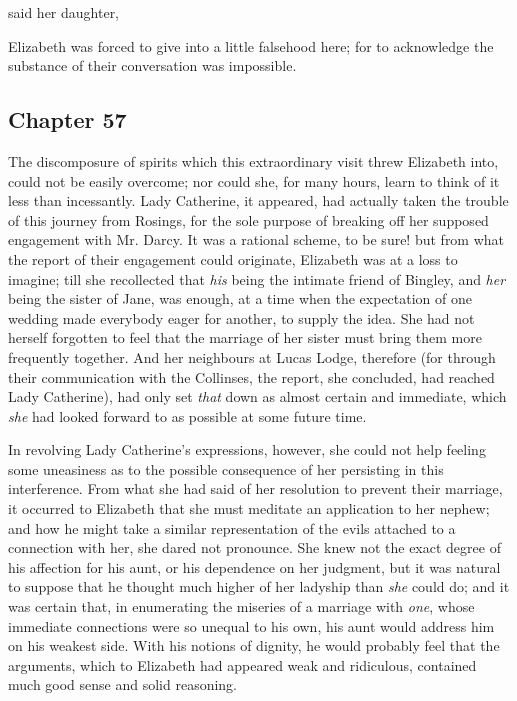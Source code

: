  said her daughter, 


Elizabeth was forced to give into a little falsehood here; for to acknowledge the substance of their conversation was impossible.

\subsection[chapter-57]{\useURL[url57][][][]\from[url57] Chapter 57}

The discomposure of spirits which this extraordinary visit threw Elizabeth into, could not be easily overcome; nor could she, for many hours, learn to think of it less than incessantly. Lady Catherine, it appeared, had actually taken the trouble of this journey from Rosings, for the sole purpose of breaking off her supposed engagement with Mr. Darcy. It was a rational scheme, to be sure! but from what the report of their engagement could originate, Elizabeth was at a loss to imagine; till she recollected that {\em his} being the intimate friend of Bingley, and {\em her} being the sister of Jane, was enough, at a time when the expectation of one wedding made everybody eager for another, to supply the idea. She had not herself forgotten to feel that the marriage of her sister must bring them more frequently together. And her neighbours at Lucas Lodge, therefore (for through their communication with the Collinses, the report, she concluded, had reached Lady Catherine), had only set {\em that} down as almost certain and immediate, which {\em she} had looked forward to as possible at some future time.

In revolving Lady Catherine's expressions, however, she could not help feeling some uneasiness as to the possible consequence of her persisting in this interference. From what she had said of her resolution to prevent their marriage, it occurred to Elizabeth that she must meditate an application to her nephew; and how he might take a similar representation of the evils attached to a connection with her, she dared not pronounce. She knew not the exact degree of his affection for his aunt, or his dependence on her judgment, but it was natural to suppose that he thought much higher of her ladyship than {\em she} could do; and it was certain that, in enumerating the miseries of a marriage with {\em one}, whose immediate connections were so unequal to his own, his aunt would address him on his weakest side. With his notions of dignity, he would probably feel that the arguments, which to Elizabeth had appeared weak and ridiculous, contained much good sense and solid reasoning.

